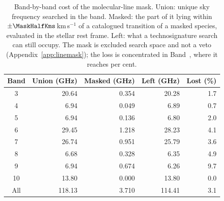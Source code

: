 \begin{table}
\centering
\footnotesize
\setlength{\tabcolsep}{4pt}
\caption{Band-by-band cost of the molecular-line mask. Union: unique sky frequency searched in the band. Masked: the part of it lying within $\pm\MaskHalfKms$\,km\,s$^{-1}$ of a catalogued transition of a masked species, evaluated in the stellar rest frame. Left: what a technosignature search can still occupy. The mask is excluded search space and not a veto (Appendix~\ref{app:linemask}); the loss is concentrated in Band~\FrMaskWorstBand, where it reaches \FrMaskWorstPct{} per cent.}
\label{tab:maskband}
\begin{tabular}{@{}crrrr@{}}
\hline
Band & Union (GHz) & Masked (GHz) & Left (GHz) & Lost (\%) \\
\hline
3 & 20.64 & 0.354 & 20.28 & 1.7 \\
4 & 6.94 & 0.049 & 6.89 & 0.7 \\
5 & 6.94 & 0.136 & 6.80 & 2.0 \\
6 & 29.45 & 1.218 & 28.23 & 4.1 \\
7 & 26.74 & 0.951 & 25.79 & 3.6 \\
8 & 6.68 & 0.328 & 6.35 & 4.9 \\
9 & 6.94 & 0.674 & 6.26 & 9.7 \\
10 & 13.80 & 0.000 & 13.80 & 0.0 \\
\hline
All & 118.13 & 3.710 & 114.41 & 3.1 \\
\hline
\end{tabular}
\end{table}
